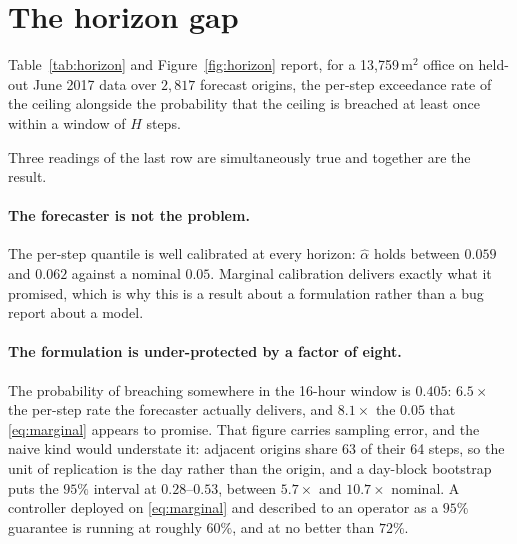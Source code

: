 \section{The horizon gap}
\label{sec:horizon}




Table~\ref{tab:horizon} and Figure~\ref{fig:horizon} report, for a
13{,}759\,m$^2$ office on held-out June 2017 data over $2{,}817$ forecast
origins, the per-step exceedance rate of the ceiling alongside the probability
that the ceiling is breached at least once within a window of $H$ steps.

Three readings of the last row are simultaneously true and together are the
result.

\paragraph{The forecaster is not the problem.} The per-step quantile is well
calibrated at every horizon: $\hat\alpha$ holds between $0.059$ and $0.062$
against a nominal $0.05$. Marginal calibration delivers exactly what it
promised, which is why this is a result about a formulation rather than a bug
report about a model.

\paragraph{The formulation is under-protected by a factor of eight.} The
probability of breaching somewhere in the 16-hour window is $0.405$: $6.5\times$
the per-step rate the forecaster actually delivers, and $8.1\times$ the $0.05$
that \eqref{eq:marginal} appears to promise. That figure carries sampling
error, and the naive kind would understate it: adjacent origins share 63 of
their 64 steps, so the unit of replication is the day rather than the origin,
and a day-block bootstrap puts the $95\%$ interval at $0.28$--$0.53$, between
$5.7\times$ and $10.7\times$ nominal. A controller deployed on
\eqref{eq:marginal} and described to an operator as a $95\%$ guarantee is
running at roughly $60\%$, and at no better than $72\%$.

